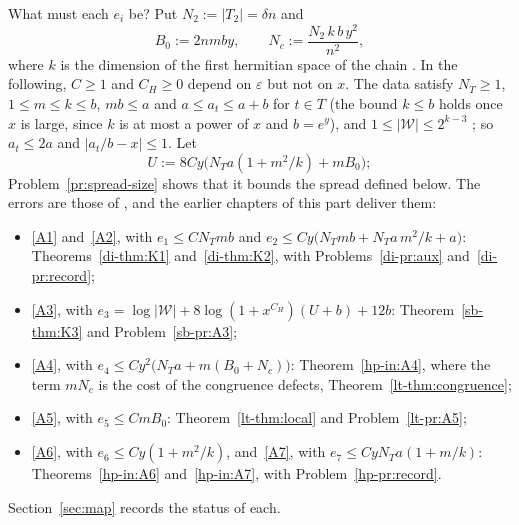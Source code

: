 \documentclass[reqno]{amsart}
\newcounter{chap}
\theoremstyle{definition}
\theoremstyle{plain}
\newcommand{\Wc}{\mathcal{W}}
\begin{document}
What must each \(e_i\) be?  Put \(N_2 := \lvert T_2\rvert = \delta n\) and
\[
  B_0 := 2nmby , \qquad N_c := \frac{N_2\,k\,b\,y^2}{n^2} ,
\]
where \(k\) is the dimension of the first hermitian space of the chain \cite[\S6.1]{Zh}.  In the following, \(C \ge 1\) and \(C_H \ge 0\) depend on \(\varepsilon\) but not on \(x\).  The data satisfy \(N_T \ge 1\), \(1 \le m \le k \le b\), \(mb \le a\) and \(a \le a_t \le a + b\) for \(t \in T\) \cite[Def.~18.5, Lemma~18.15]{Adr} (the bound \(k \le b\) holds once \(x\) is large, since \(k\) is at most a power of \(x\) and \(b = e^y\)), and \(1 \le \lvert\Wc\rvert \le 2^{k-3}\) \cite[Def.~18.9(a)]{Adr}; so \(a_t \le 2a\) and \(\lvert a_t/b - x\rvert \le 1\).  Let
\[
  U := 8Cy\bigl(N_Ta(1 + m^2/k) + mB_0\bigr) ;
\]
Problem~\ref{pr:spread-size} shows that it bounds the spread defined below.  The errors are those of \cite[Def.~18.9 and Prop.~18.14]{Adr}, and the earlier chapters of this part deliver them:
\begin{itemize}
\item \eqref{A1} and~\eqref{A2}, with \(e_1 \le CN_Tmb\) and \(e_2 \le Cy\bigl(N_Tmb + N_Ta\,m^2/k + a\bigr)\): Theorems~\ref{di-thm:K1} and~\ref{di-thm:K2}, with Problems~\ref{di-pr:aux} and~\ref{di-pr:record};
\item \eqref{A3}, with \(e_3 = \log\lvert\Wc\rvert + 8\log(1 + x^{C_H})(U + b) + 12b\): Theorem~\ref{sb-thm:K3} and Problem~\ref{sb-pr:A3};
\item \eqref{A4}, with \(e_4 \le Cy^2\bigl(N_Ta + m(B_0 + N_c)\bigr)\): Theorem~\ref{hp-in:A4}, where the term \(mN_c\) is the cost of the congruence defects, Theorem~\ref{lt-thm:congruence};
\item \eqref{A5}, with \(e_5 \le CmB_0\): Theorem~\ref{lt-thm:local} and Problem~\ref{lt-pr:A5};
\item \eqref{A6}, with \(e_6 \le Cy(1 + m^2/k)\), and~\eqref{A7}, with \(e_7 \le CyN_Ta(1 + m/k)\): Theorems~\ref{hp-in:A6} and~\ref{hp-in:A7}, with Problem~\ref{hp-pr:record}.
\end{itemize}
Section~\ref{sec:map} records the status of each.
\end{document}
